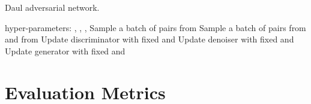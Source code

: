 \documentclass[runningheads]{llncs}
\begin{document}
\begin{algorithm}[t]
    \caption{Daul adversarial network.} \label{alg:bianet-joint}
    \begin{algorithmic}[1]
        \REQUIRE hyper-parameters: , , , 
        \FOR {}
        \STATE Sample a batch of pairs  from 
        \STATE Sample a batch of pairs  from 
               and  from  
        \STATE Update discriminator  with fixed  and 
        \ENDFOR
        \STATE Update denoiser  with fixed  and 
        \STATE Update generator  with fixed  and 
        \ENDWHILE
    \end{algorithmic}
\end{algorithm}
\vspace{-2mm}

\section{Evaluation Metrics}\label{sec:metric}
\end{document}
